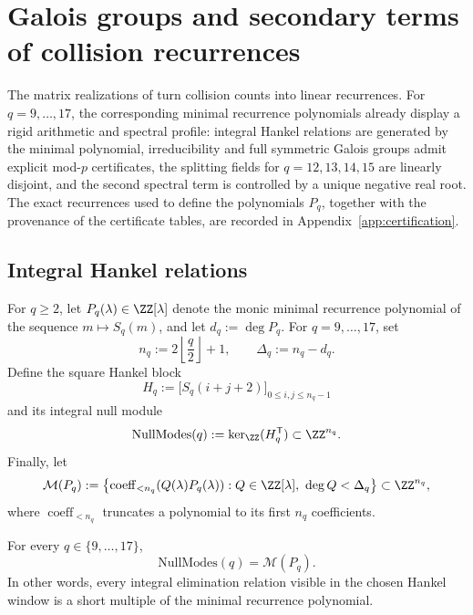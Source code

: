 \section{Galois groups and secondary terms of collision recurrences}
\label{sec:chebotarev}

The matrix realizations of  turn collision counts into
linear recurrences.  For \(q=9,\dots,17\), the corresponding minimal
recurrence polynomials already display a rigid arithmetic and spectral
profile: integral Hankel relations are generated by the minimal polynomial,
irreducibility and full symmetric Galois groups admit explicit mod-\(p\)
certificates, the splitting fields for \(q=12,13,14,15\) are linearly
disjoint, and the second spectral term is controlled by a unique negative real
root.  The exact recurrences used to define the polynomials \(P_q\), together
with the provenance of the certificate tables, are recorded in
Appendix~\ref{app:certification}.

\subsection{Integral Hankel relations}

\begin{definition}
\label{def:resonance-polynomials}
For \(q\ge 2\), let \(P_q(\lambda)\in\ZZ[\lambda]\) denote the monic minimal
recurrence polynomial of the sequence \(m\mapsto S_q(m)\), and let
\(d_q:=\deg P_q\).  For \(q=9,\dots,17\), set
\[
  n_q:=2\left\lfloor\frac{q}{2}\right\rfloor+1,
  \qquad
  \Delta_q:=n_q-d_q.
\]
Define the square Hankel block
\[
  H_q:=\bigl[S_q(i+j+2)\bigr]_{0\le i,j\le n_q-1}
\]
and its integral null module
\[
  \mathrm{NullModes}(q):=\ker_{\ZZ}(H_q^{\mathsf T})\subset \ZZ^{n_q}.
\]
Finally, let
\[
  \mathcal M(P_q):=
  \bigl\{\operatorname{coeff}_{<n_q}(Q(\lambda)P_q(\lambda)):
  Q\in\ZZ[\lambda],\ \deg Q<\Delta_q\bigr\}\subset\ZZ^{n_q},
\]
where \(\operatorname{coeff}_{<n_q}\) truncates a polynomial to its first
\(n_q\) coefficients.
\end{definition}

\begin{theorem}
\label{thm:principalization}
For every \(q\in\{9,\dots,17\}\),
\[
  \mathrm{NullModes}(q)=\mathcal M(P_q).
\]
In other words, every integral elimination relation visible in the chosen
Hankel window is a short multiple of the minimal recurrence polynomial.
\end{theorem}

